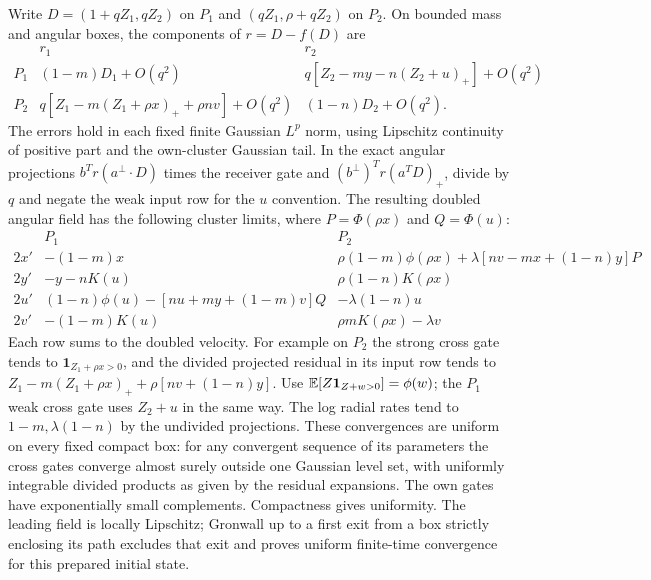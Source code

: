 \documentclass[11pt]{article}
\begin{document}
Write $D=(1+qZ_1,qZ_2)$ on $P_1$ and $(qZ_1,\rho+qZ_2)$ on
$P_2$. On bounded mass and angular boxes, the components
of $r=D-f(D)$ are
\[
\begin{array}{c|cc}
 &r_1&r_2\\ \hline
 P_1&(1-m)D_1+O(q^2)&
 q[Z_2-my-n(Z_2+u)_+]+O(q^2)\\
 P_2&q[Z_1-m(Z_1+\rho x)_++\rho nv]+O(q^2)&
 (1-n)D_2+O(q^2).
\end{array}
\]
The errors hold in each fixed finite Gaussian $L^p$ norm, using
Lipschitz continuity of positive part and the own-cluster Gaussian
tail. In the exact angular projections $b^Tr(a^\perp\cdot D)$
times the receiver gate and $(b^\perp)^Tr(a^TD)_+$, divide by
$q$ and negate the weak input row for the $u$ convention.
The resulting doubled angular field has the following cluster limits,
where $P=\Phi(\rho x)$ and $Q=\Phi(u)$:
\[
\begin{array}{c|cc}
 &P_1&P_2\\\hline
 2x'&-(1-m)x&\rho(1-m)\phi(\rho x)+
          \lambda[nv-mx+(1-n)y]P\\
 2y'&-y-nK(u)&\rho(1-n)K(\rho x)\\
 2u'&(1-n)\phi(u)-[nu+my+(1-m)v]Q&-\lambda(1-n)u\\
 2v'&-(1-m)K(u)&\rho mK(\rho x)-\lambda v
\end{array}
\]
Each row sums to the doubled velocity. For example on $P_2$ the
strong cross gate tends to $\mathbf1_{Z_1+\rho x>0}$, and the
divided projected residual in its input row tends to
$Z_1-m(Z_1+\rho x)_++\rho[nv+(1-n)y]$.
Use $\mathbb E[Z{\bf1}_{Z+w>0}]=\phi(w)$; the $P_1$ weak cross
gate uses $Z_2+u$ in the same way. The log radial rates tend to
$1-m,\lambda(1-n)$ by the undivided projections. These convergences
are uniform on every fixed compact box: for any convergent sequence
of its parameters the cross gates converge almost surely outside
one Gaussian level set, with uniformly integrable divided products
as given by the residual expansions. The own gates have exponentially
small complements. Compactness gives uniformity. The leading field
is locally Lipschitz; Gronwall up to a first exit from a box strictly
enclosing its path excludes that exit and proves uniform finite-time
convergence for this prepared initial state.
\end{document}
